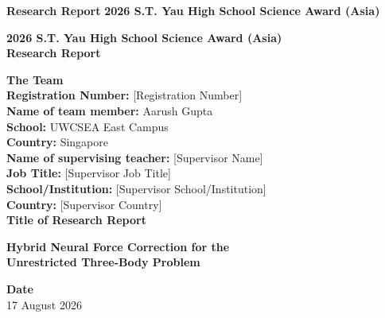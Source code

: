 \documentclass[12pt]{article}
\begin{document}

\begin{titlepage}
\thispagestyle{empty}

\begin{flushleft}
\textbf{Research Report} \hfill \textbf{2026 S.T. Yau High School Science Award (Asia)}
\end{flushleft}

\vspace{1.2cm}

\begin{center}
{\Large \textbf{2026 S.T. Yau High School Science Award (Asia)}}\\[0.3cm]
{\Large \textbf{Research Report}}\\[1.2cm]
\end{center}

\noindent\textbf{The Team}\\[0.4cm]

\noindent\textbf{Registration Number:} [Registration Number]\\[0.5cm]

\noindent\textbf{Name of team member:} Aarush Gupta\\
\textbf{School:} UWCSEA East Campus\\
\textbf{Country:} Singapore\\[0.8cm]

\noindent\textbf{Name of supervising teacher:} [Supervisor Name]\\
\textbf{Job Title:} [Supervisor Job Title]\\
\textbf{School/Institution:} [Supervisor School/Institution]\\
\textbf{Country:} [Supervisor Country]\\[1.2cm]

\noindent\textbf{Title of Research Report}\\[0.3cm]
\begin{center}
{\Large \textbf{Hybrid Neural Force Correction for the\\[0.2cm]
Unrestricted Three-Body Problem}}
\end{center}

\vfill

\begin{center}
\textbf{Date}\\
17 August 2026
\end{center}

\end{titlepage}
\end{document}
